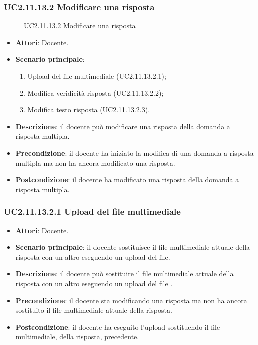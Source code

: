 \subsubsection{UC2.11.13.2 Modificare una risposta}
\begin{figure}[H]
\centering
\noindent{}
\caption{UC2.11.13.2 Modificare una risposta}
\end{figure}
\begin{itemize}
\item \textbf{Attori}: Docente.
\item \textbf{Scenario principale}:
\begin{enumerate}
\item Upload del file multimediale (UC2.11.13.2.1);
\item Modifica veridicità risposta (UC2.11.13.2.2);
\item Modifica testo risposta (UC2.11.13.2.3).
\end{enumerate}
\item \textbf{Descrizione}: il docente può modificare una risposta della domanda a risposta multipla.
\item \textbf{Precondizione}: il docente ha iniziato la modifica di una domanda a risposta multipla ma non ha ancora modificato una risposta.
\item \textbf{Postcondizione}: il docente ha modificato una risposta della domanda a risposta multipla.
\end{itemize}
\subsubsection{UC2.11.13.2.1 Upload del file multimediale}
\begin{itemize}
\item \textbf{Attori}: Docente.
\item \textbf{Scenario principale}: il docente sostituisce il file multimediale attuale della risposta con un altro eseguendo un upload del file.
\item \textbf{Descrizione}: il docente può sostituire il file multimediale attuale della risposta con un altro eseguendo un upload del file
.
\item \textbf{Precondizione}: il docente sta modificando una risposta ma non ha ancora sostituito il file multimediale attuale della risposta.
\item \textbf{Postcondizione}: il docente ha eseguito l'upload sostituendo il file multimediale, della risposta, precedente.
\end{itemize}
